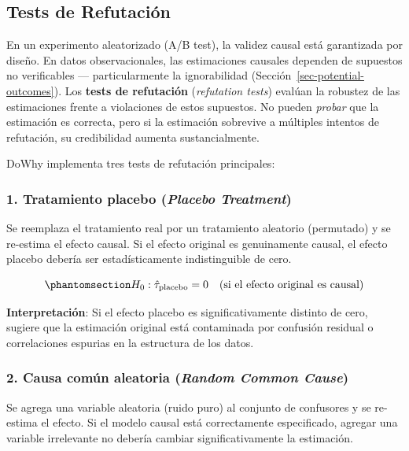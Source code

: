 \documentclass[
  spanish,
  11pt,
  letterpaper,
]{scrbook}
\theoremstyle{plain}
\theoremstyle{remark}
\begin{document}
\subsection{Tests de Refutación}\label{sec-refutation-tests}

En un experimento aleatorizado (A/B test), la validez causal está
garantizada por diseño. En datos observacionales, las estimaciones
causales dependen de supuestos no verificables --- particularmente la
ignorabilidad (Sección~\ref{sec-potential-outcomes}). Los \textbf{tests
de refutación} (\emph{refutation tests}) evalúan la robustez de las
estimaciones frente a violaciones de estos supuestos. No pueden
\emph{probar} que la estimación es correcta, pero si la estimación
sobrevive a múltiples intentos de refutación, su credibilidad aumenta
sustancialmente.

DoWhy implementa tres tests de refutación principales:

\subsubsection{\texorpdfstring{1. Tratamiento placebo (\emph{Placebo
Treatment})}{1. Tratamiento placebo (Placebo Treatment)}}\label{tratamiento-placebo-placebo-treatment}

Se reemplaza el tratamiento real por un tratamiento aleatorio
(permutado) y se re-estima el efecto causal. Si el efecto original es
genuinamente causal, el efecto placebo debería ser estadísticamente
indistinguible de cero.

\begin{equation}\protect\phantomsection\label{eq-placebo}{
H_0: \hat{\tau}_{\text{placebo}} = 0 \quad \text{(si el efecto original es causal)}
}\end{equation}

\textbf{Interpretación}: Si el efecto placebo es significativamente
distinto de cero, sugiere que la estimación original está contaminada
por confusión residual o correlaciones espurias en la estructura de los
datos.

\subsubsection{\texorpdfstring{2. Causa común aleatoria (\emph{Random
Common
Cause})}{2. Causa común aleatoria (Random Common Cause)}}\label{causa-comuxfan-aleatoria-random-common-cause}

Se agrega una variable aleatoria (ruido puro) al conjunto de confusores
y se re-estima el efecto. Si el modelo causal está correctamente
especificado, agregar una variable irrelevante no debería cambiar
significativamente la estimación.
\end{document}
